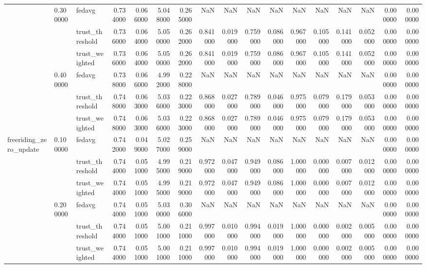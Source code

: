 \begin{tabular}{lllrrrrrrrrrrrrrr}
\cline{2-17}
 & \multirow[t]{3}{*}{0.300000} & fedavg & 0.734000 & 0.066000 & 5.048000 & 0.265000 & NaN & NaN & NaN & NaN & NaN & NaN & NaN & NaN & 0.000000 & 0.000000 \\
 &  & trust_threshold & 0.736000 & 0.064000 & 5.050000 & 0.262000 & 0.841000 & 0.019000 & 0.759000 & 0.086000 & 0.967000 & 0.105000 & 0.141000 & 0.052000 & 0.000000 & 0.000000 \\
 &  & trust_weighted & 0.736000 & 0.064000 & 5.050000 & 0.262000 & 0.841000 & 0.019000 & 0.759000 & 0.086000 & 0.967000 & 0.105000 & 0.141000 & 0.052000 & 0.000000 & 0.000000 \\
\cline{2-17}
 & \multirow[t]{3}{*}{0.400000} & fedavg & 0.738000 & 0.066000 & 4.992000 & 0.228000 & NaN & NaN & NaN & NaN & NaN & NaN & NaN & NaN & 0.000000 & 0.000000 \\
 &  & trust_threshold & 0.748000 & 0.063000 & 5.036000 & 0.223000 & 0.868000 & 0.027000 & 0.789000 & 0.046000 & 0.975000 & 0.079000 & 0.179000 & 0.053000 & 0.000000 & 0.000000 \\
 &  & trust_weighted & 0.748000 & 0.063000 & 5.036000 & 0.223000 & 0.868000 & 0.027000 & 0.789000 & 0.046000 & 0.975000 & 0.079000 & 0.179000 & 0.053000 & 0.000000 & 0.000000 \\
\cline{1-17} \cline{2-17}
\multirow[t]{12}{*}{freeriding_zero_update} & \multirow[t]{3}{*}{0.100000} & fedavg & 0.742000 & 0.049000 & 5.027000 & 0.259000 & NaN & NaN & NaN & NaN & NaN & NaN & NaN & NaN & 0.000000 & 0.000000 \\
 &  & trust_threshold & 0.744000 & 0.051000 & 4.995000 & 0.219000 & 0.972000 & 0.047000 & 0.949000 & 0.086000 & 1.000000 & 0.000000 & 0.007000 & 0.012000 & 0.000000 & 0.000000 \\
 &  & trust_weighted & 0.744000 & 0.051000 & 4.995000 & 0.219000 & 0.972000 & 0.047000 & 0.949000 & 0.086000 & 1.000000 & 0.000000 & 0.007000 & 0.012000 & 0.000000 & 0.000000 \\
\cline{2-17}
 & \multirow[t]{3}{*}{0.200000} & fedavg & 0.744000 & 0.051000 & 5.030000 & 0.306000 & NaN & NaN & NaN & NaN & NaN & NaN & NaN & NaN & 0.000000 & 0.000000 \\
 &  & trust_threshold & 0.744000 & 0.051000 & 5.001000 & 0.211000 & 0.997000 & 0.010000 & 0.994000 & 0.019000 & 1.000000 & 0.000000 & 0.002000 & 0.005000 & 0.000000 & 0.000000 \\
 &  & trust_weighted & 0.744000 & 0.051000 & 5.001000 & 0.211000 & 0.997000 & 0.010000 & 0.994000 & 0.019000 & 1.000000 & 0.000000 & 0.002000 & 0.005000 & 0.000000 & 0.000000 \\

\end{tabular}

